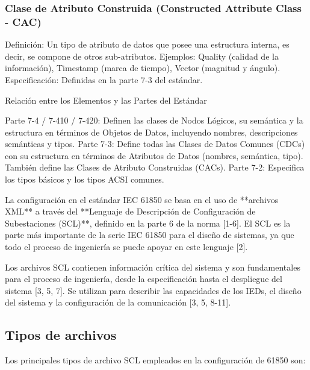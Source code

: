 \documentclass[a5paper]{book}%
\begin{document}
    \subsubsection{Clase de Atributo Construida (Constructed Attribute Class - CAC)}
    

    Definición: Un tipo de atributo de datos que posee una estructura interna, es decir, se compone de otros sub-atributos.
    Ejemplos: Quality (calidad de la información), Timestamp (marca de tiempo), Vector (magnitud y ángulo).
    Especificación: Definidas en la parte 7-3 del estándar.

Relación entre los Elementos y las Partes del Estándar

    Parte 7-4 / 7-410 / 7-420: Definen las clases de Nodos Lógicos, su semántica y la estructura en términos de Objetos de Datos, incluyendo nombres, descripciones semánticas y tipos.
    Parte 7-3: Define todas las Clases de Datos Comunes (CDCs) con su estructura en términos de Atributos de Datos (nombres, semántica, tipo). También define las Clases de Atributo Construidas (CACs).
    Parte 7-2: Especifica los tipos básicos y los tipos ACSI comunes.


    La configuración en el estándar IEC 61850 se basa en el uso de **archivos XML** a través del **Lenguaje de Descripción de Configuración de Subestaciones (SCL)**, definido en la parte 6 de la norma [1-6]. El SCL es la parte más importante de la serie IEC 61850 para el diseño de sistemas, ya que todo el proceso de ingeniería se puede apoyar en este lenguaje [2].

Los archivos SCL contienen información crítica del sistema y son fundamentales para el proceso de ingeniería, desde la especificación hasta el despliegue del sistema [3, 5, 7]. Se utilizan para describir las capacidades de los IEDs, el diseño del sistema y la configuración de la comunicación [3, 5, 8-11].


\subsection{Tipos de archivos }

Los principales tipos de archivo SCL empleados en la configuración de 61850 son:
\end{document}
